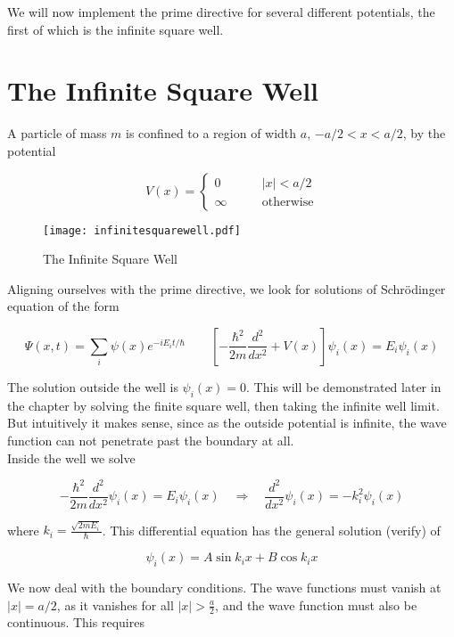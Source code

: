 We will now implement the prime directive for several different potentials, the
first of which is the infinite square well. 


\section{The Infinite Square Well}

A particle of mass $m$ is confined to a region of width $a$, $-a/2 < x < a/2$,
by the potential 

 \[
V(x) = \begin{cases}
  0 &\qquad |x| < a/2 \\
  \infty &\qquad \text{otherwise} 
\end{cases} 
\] \vspace{3px}

\begin{figure}[H]
  \centering
    \texttt{[image: infinitesquarewell.pdf]}
    \caption{The Infinite Square Well}
\end{figure}

Aligning ourselves with the prime directive, we look for solutions of Schr\"odinger equation of the
form 

\[
  \Psi(x, t) = \sum_i \psi(x)e^{-i E_i t/\hbar} \qquad \left[
  -\frac{\hbar^2}{2m} \frac{d^2 }{d x^2} + V(x) \right] \psi_i(x) = E_i
  \psi_i(x) 
\] \vspace{3px}

The solution outside the well is $\psi_i(x) = 0$. This will be demonstrated
later in the chapter by solving the finite square well, then taking the
infinite well limit. But intuitively it makes sense, since as the outside
potential is infinite, the wave function can not penetrate past the boundary at
all. \\

Inside the well we solve 

\[
-\frac{\hbar^2}{2m} \frac{d^2 }{d x^2} \psi_i(x) = E_i \psi_i(x) \quad
\Rightarrow \quad \frac{d^2 }{d x^2} \psi_i(x) = -k_i^2 \psi_i(x)
\] \vspace{3px}   


where $k_i = \frac{\sqrt{2mE_i}}{\hbar}$. This differential equation has the
general solution (verify) of 

\[
\psi_i(x) = A\sin k_ix + B\cos k_i x
\] \vspace{3px}

We now deal with the boundary conditions. The wave functions must vanish at
$|x| = a/2$, as it vanishes for all  $|x| > \frac{a}{2}$, and the wave function
must also be continuous. This requires 


